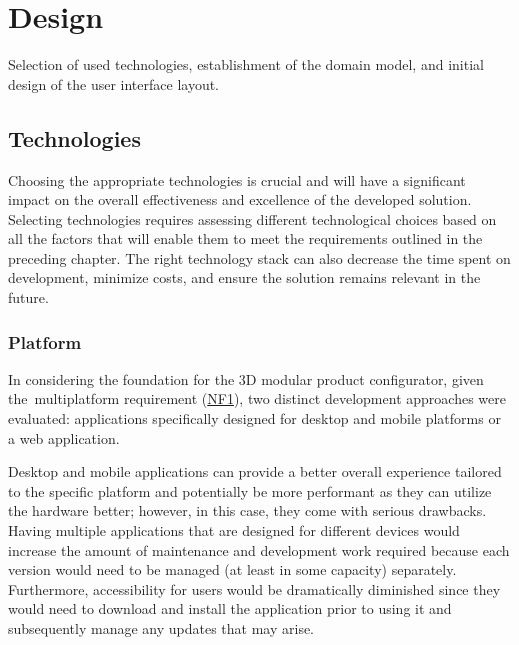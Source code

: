 \chapter{Design}

\begin{chapterabstract}
Selection of used technologies, establishment of the domain model, and initial design of the user interface layout.
\end{chapterabstract}


\section{Technologies}

Choosing the appropriate technologies is crucial and will have a significant impact on the overall effectiveness and excellence of the developed solution. Selecting technologies requires assessing different technological choices based on all the factors that will enable them to meet the requirements outlined in the preceding chapter. The right technology stack can also decrease the time spent on development, minimize costs, and ensure the solution remains relevant in the future.


\subsection{Platform}

In considering the foundation for the 3D modular product configurator, given the~multiplatform requirement (\hyperref[itm:NF1]{NF1}), two distinct development approaches were evaluated: applications specifically designed for desktop and mobile platforms or a web application.

Desktop and mobile applications can provide a better overall experience tailored to the specific platform and potentially be more performant as they can utilize the hardware better; however, in this case, they come with serious drawbacks. Having multiple applications that are designed for different devices would increase the amount of maintenance and development work required because each version would need to be managed (at least in some capacity) separately. Furthermore, accessibility for users would be dramatically diminished since they would need to download and install the application prior to using it and subsequently manage any updates that may arise.


